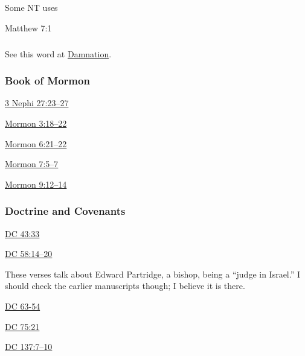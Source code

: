 				\begin{compactdesc}
					\item[Some NT uses] \textbf{}
						\begin{compactdesc}
							\item[Matthew 7:1] 
						\end{compactdesc}
				\end{compactdesc}
				
			\subparagraph{\texorpdfstring{\gr{κρίσις}}{}}
			
				See this word at \hyperref[DAMNATION]{Damnation}.
		
	\subsubsection{Book of Mormon} %
		\label{JUDGE-BOM}
	
		
		\begin{compactdesc}
			\item[{\hyperref[3NEPHI-27-23]{3 Nephi 27:23--27}}]
			\item[{\hyperref[MORMON-3-18]{Mormon 3:18--22}}]
			\item[{\hyperref[MORMON-6-21]{Mormon 6:21--22}}]
			\item[{\hyperref[MORMON-7-5]{Mormon 7:5--7}}]
			\item[{\hyperref[MORMON-9-12]{Mormon 9:12--14}}]
		\end{compactdesc}
		
	\subsubsection{Doctrine and Covenants} %
		\label{JUDGE-DC}
	
		
		\begin{compactdesc}
			\item[{\hyperref[DC43-33]{DC 43:33}}] 
			\item[{\hyperref[DC58-14]{DC 58:14--20}}] 
				\begin{compactitem}
					\item These verses talk about Edward Partridge, a bishop, being a ``judge in Israel.'' I should check the earlier manuscripts though; I believe it is there.
				\end{compactitem}
			\item[{\hyperref[DC63-54]{DC 63-54}}]
			\item[{\hyperref[DC75-21]{DC 75:21}}]
			\item[{\hyperref[DC137-7]{DC 137:7--10}}]
		\end{compactdesc}
		
